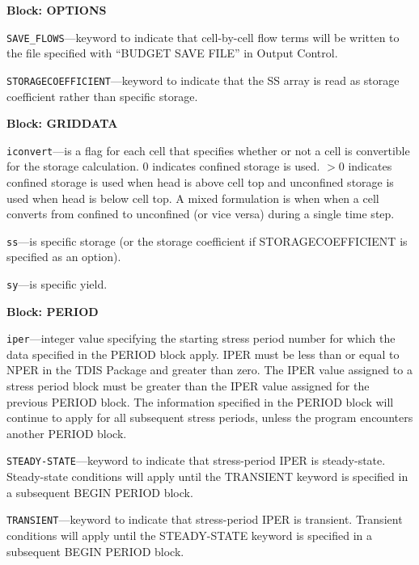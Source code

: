 
\item \textbf{Block: OPTIONS}

\begin{description}
\item \texttt{SAVE\_FLOWS}---keyword to indicate that cell-by-cell flow terms will be written to the file specified with ``BUDGET SAVE FILE'' in Output Control.

\item \texttt{STORAGECOEFFICIENT}---keyword to indicate that the SS array is read as storage coefficient rather than specific storage.

\end{description}
\item \textbf{Block: GRIDDATA}

\begin{description}
\item \texttt{iconvert}---is a flag for each cell that specifies whether or not a cell is convertible for the storage calculation.  0 indicates confined storage is used. $>$0 indicates confined storage is used when head is above cell top and unconfined storage is used when head is below cell top.  A mixed formulation is when when a cell converts from confined to unconfined (or vice versa) during a single time step.

\item \texttt{ss}---is specific storage (or the storage coefficient if STORAGECOEFFICIENT is specified as an option).

\item \texttt{sy}---is specific yield.

\end{description}
\item \textbf{Block: PERIOD}

\begin{description}
\item \texttt{iper}---integer value specifying the starting stress period number for which the data specified in the PERIOD block apply.  IPER must be less than or equal to NPER in the TDIS Package and greater than zero.  The IPER value assigned to a stress period block must be greater than the IPER value assigned for the previous PERIOD block.  The information specified in the PERIOD block will continue to apply for all subsequent stress periods, unless the program encounters another PERIOD block.

\item \texttt{STEADY-STATE}---keyword to indicate that stress-period IPER is steady-state. Steady-state conditions will apply until the TRANSIENT keyword is specified in a subsequent BEGIN PERIOD block.

\item \texttt{TRANSIENT}---keyword to indicate that stress-period IPER is transient. Transient conditions will apply until the STEADY-STATE keyword is specified in a subsequent BEGIN PERIOD block.

\end{description}

